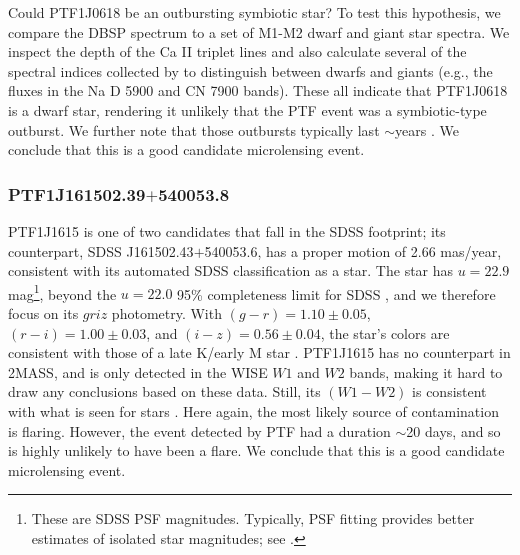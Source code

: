 \documentclass{emulateapj}
\begin{document}
Could PTF1J0618 be an outbursting symbiotic star? To test this hypothesis, we compare the DBSP spectrum to a set of M1-M2 dwarf and giant star spectra. We inspect the depth of the Ca II triplet lines and also calculate several of the spectral indices collected by \citet{kev06} to distinguish between dwarfs and giants (e.g., the fluxes in the Na D 5900 and CN 7900 bands). These all indicate that PTF1J0618 is a dwarf star, rendering it unlikely that the PTF event was a symbiotic-type outburst. We further note that those outbursts typically last $\sim$years \citep[e.g.,][]{tomov2013}. We conclude that this is a good candidate microlensing event.


\subsubsection*{PTF1J161502.39$+$540053.8} %
PTF1J1615 is one of two candidates that fall in the SDSS footprint; its counterpart, SDSS J161502.43$+$540053.6, has a proper motion of 2.66 mas/year, consistent with its automated SDSS classification as a star. The star has $u = 22.9$ mag\footnote{These are SDSS PSF magnitudes. Typically, PSF fitting provides better estimates of isolated star magnitudes; see \citet{stoughton02}.}, beyond the $u = 22.0$ 95\% completeness limit for SDSS \citep{stoughton02}, and we therefore focus on its $griz$ photometry. With $(g-r) = 1.10\pm0.05$, $(r-i) = 1.00\pm0.03$, and $(i-z) = 0.56\pm0.04$, the star's colors are consistent with those of a late K/early M star \citep{kev07}. PTF1J1615 has no counterpart in 2MASS, and is only detected in the WISE $W1$ and $W2$ bands, making it hard to draw any conclusions based on these data. Still, its $(W1-W2)$ is consistent with what is seen for stars \citep[cf.\ Figure 14 in][]{yan2013}. Here again, the most likely source of contamination is flaring. However, the event detected by PTF had a duration $\sim$20 days, and so is highly unlikely to have been a flare. We conclude that this is a good candidate microlensing event.
\end{document}
